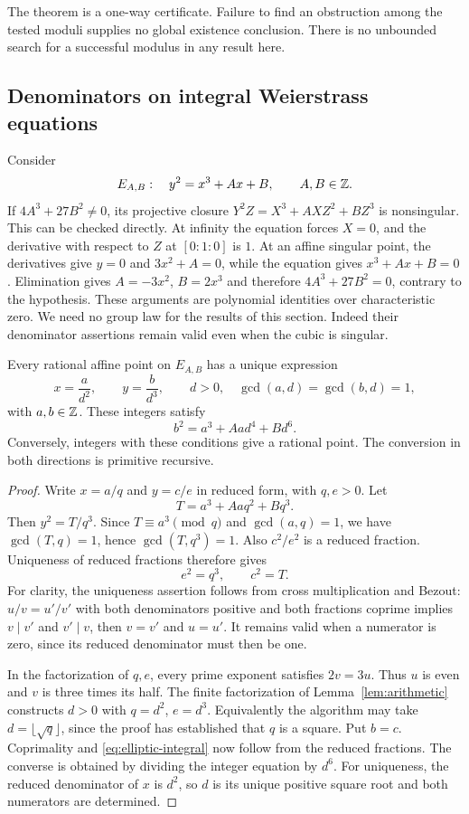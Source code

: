 The theorem is a one-way certificate. Failure to find an obstruction among
the tested moduli supplies no global existence conclusion. There is no
unbounded search for a successful modulus in any result here.

\subsection{Denominators on integral Weierstrass equations}

Consider
\[
      E_{A,B}:\quad y^2=x^3+Ax+B,\qquad A,B\in\mathbb Z.
\]
If $4A^3+27B^2\ne0$, its projective closure
$Y^2Z=X^3+AXZ^2+BZ^3$ is nonsingular. This can be checked directly.
At infinity the equation forces $X=0$, and the derivative with respect to
$Z$ at $[0:1:0]$ is $1$. At an affine singular point, the derivatives give
$y=0$ and $3x^2+A=0$, while the equation gives $x^3+Ax+B=0$.
Elimination gives $A=-3x^2$, $B=2x^3$ and therefore
$4A^3+27B^2=0$, contrary to the hypothesis. These arguments are polynomial
identities over characteristic zero. We need no group law for the results
of this section. Indeed their denominator assertions remain valid even
when the cubic is singular.

\begin{theorem}\label{thm:denominators}
Every rational affine point on $E_{A,B}$ has a unique expression
\[
        x=\frac a{d^2},\qquad y=\frac b{d^3},\qquad
        d>0,\quad\gcd(a,d)=\gcd(b,d)=1,
\]
with $a,b\in\mathbb Z$. These integers satisfy
\begin{equation}\label{eq:elliptic-integral}
             b^2=a^3+Aad^4+Bd^6.
\end{equation}
Conversely, integers with these conditions give a rational point. The
conversion in both directions is primitive recursive.
\end{theorem}
\begin{proof}
Write $x=a/q$ and $y=c/e$ in reduced form, with $q,e>0$. Let
\[
             T=a^3+Aaq^2+Bq^3.
\]
Then $y^2=T/q^3$. Since $T\equiv a^3\pmod q$ and $\gcd(a,q)=1$,
we have $\gcd(T,q)=1$, hence $\gcd(T,q^3)=1$. Also
$c^2/e^2$ is a reduced fraction. Uniqueness of reduced fractions therefore
gives
\[
                         e^2=q^3,\qquad c^2=T.
\]
For clarity, the uniqueness assertion follows from cross multiplication
and Bezout: $u/v=u'/v'$ with both denominators positive and both fractions
coprime implies $v\mid v'$ and $v'\mid v$, then $v=v'$ and $u=u'$.
It remains valid when a numerator is zero, since its reduced denominator
must then be one.

In the factorization of $q,e$, every prime exponent satisfies $2v=3u$.
Thus $u$ is even and $v$ is three times its half. The finite factorization
of Lemma~\ref{lem:arithmetic} constructs $d>0$ with $q=d^2$, $e=d^3$.
Equivalently the algorithm may take $d=\lfloor\sqrt q\rfloor$, since the
proof has established that $q$ is a square. Put $b=c$. Coprimality and
\eqref{eq:elliptic-integral} now follow from the reduced fractions.
The converse is obtained by dividing the integer equation by $d^6$.
For uniqueness, the reduced denominator of $x$ is $d^2$, so $d$ is its
unique positive square root and both numerators are determined.
\end{proof}

